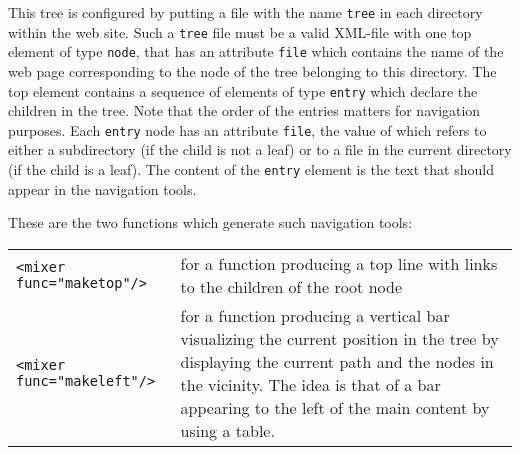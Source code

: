 \documentclass[a4paper,11pt]{article}
\begin{document}
This tree is configured by putting a file with the name \verb!tree! in
each directory within the web site. Such a \verb!tree! file must be
a valid XML-file with one top element of type \verb!node!, that has
an attribute \verb!file! which contains the name of the web page
corresponding to the node of the tree belonging to this directory.
The top element contains a sequence of elements of type \verb!entry!
which declare the children in the tree. Note that the order of the
entries matters for navigation purposes. Each \verb!entry! node
has an attribute \verb!file!, the value of which refers to either
a subdirectory (if the child is not a leaf) or to a file in the
current directory (if the child is a leaf). The content of the
\verb!entry! element is the text that should appear in the navigation
tools.

These are the two functions which generate such navigation tools:

\hspace*{3mm}
\begin{tabular}{lp{3.5in}}
  \verb!<mixer func="maketop"/>! &
  for a function producing a top line with links to the children of
  the root node \\
  \verb!<mixer func="makeleft"/>! &
  for a function producing a vertical bar visualizing the current position
  in the tree by displaying the current path and the nodes in the
  vicinity. The idea is that of a bar appearing to the left of the
  main content by using a table.
\end{tabular}
\end{document}
